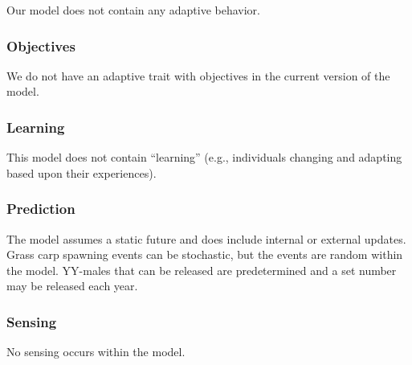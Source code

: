 \documentclass{article}[12pt]
\begin{document}
Our model does not contain any adaptive behavior.

\subsubsection{Objectives}

We do not have an adaptive trait with objectives in the current version of the model.

\subsubsection{Learning}

This model does not contain ``learning'' (e.g., individuals changing and adapting based upon their experiences). 

\subsubsection{Prediction}

The model assumes a static future and does include internal or external updates. 
Grass carp spawning events can be stochastic, but the events are random within the model.
YY-males that can be released are predetermined and a set number may be released each year.


\subsubsection{Sensing}

No sensing occurs within the model. 

\end{document}
